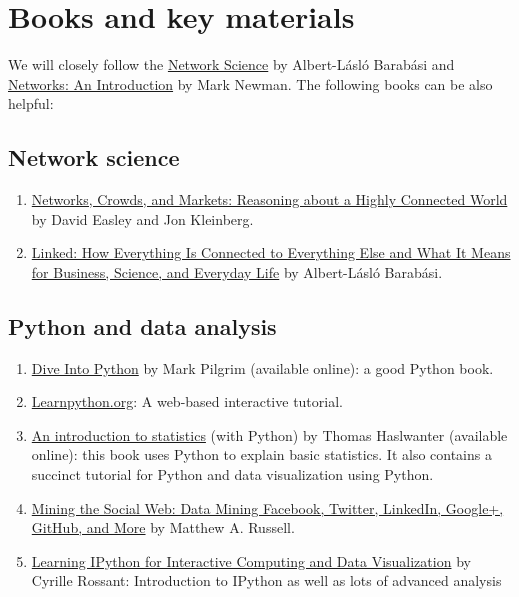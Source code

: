 \documentclass[11pt,article,oneside]{memoir} %
\begin{document}
\section{Books and key materials} %

We will closely follow the
\href{http://barabasi.com/networksciencebook/}{Network Science} by Albert-Lásló
Barabási and
\href{https://www.amazon.com/Networks-Mark-Newman/dp/0198805098}{Networks:
An Introduction} by Mark Newman. The following books can be also helpful:

\subsection{Network science} %

\begin{enumerate}
    \item \href{https://www.amazon.com/Networks-Crowds-Markets-Reasoning-Connected/dp/0521195330}{Networks, Crowds, and Markets: Reasoning about a Highly Connected World} by David Easley and Jon Kleinberg.
    \item \href{https://www.amazon.com/Linked-Everything-Connected-Business-Everyday/dp/0465085733}{Linked: How Everything Is Connected to Everything Else and What It Means for Business, Science, and Everyday Life} by Albert-Lásló Barabási.
\end{enumerate}

\subsection{Python and data analysis} %

\begin{enumerate}

\item \href{http://www.diveintopython3.net/index.html}{Dive Into Python} by Mark Pilgrim (available online): a good Python book.

\item \href{http://www.learnpython.org}{Learnpython.org}: A web-based interactive tutorial.

\item \href{http://work.thaslwanter.at/Stats/html/}{An introduction to statistics} (with Python) by Thomas Haslwanter (available online): this book uses Python to explain basic statistics. It also contains a succinct tutorial for Python and data visualization using Python.

\item \href{https://www.amazon.com/Mining-Social-Web-Facebook-LinkedIn/dp/1449367615}{Mining the Social Web: Data Mining Facebook, Twitter, LinkedIn, Google+, GitHub, and More} by Matthew A. Russell.

\item \href{http://ipython.rossant.net}{Learning IPython for Interactive Computing and Data Visualization} by  Cyrille Rossant: Introduction to IPython as well as lots of advanced analysis


\end{enumerate} %
\end{document}
